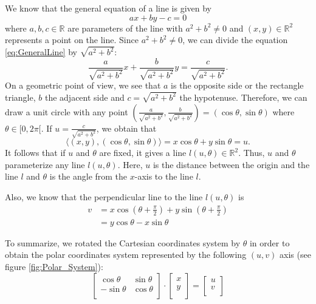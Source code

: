 \documentclass{article}
\begin{document}
We know that the general equation of a line is given by 
\begin{equation} \label{eq:GeneralLine}
	ax + by - c = 0
\end{equation}
where $a,b,c \in \mathbb{R}$ are parameters of the line with $a^2 +  b^2 \neq 0$ and $(x, y) \in \mathbb{R}^2$ represents a point on the line. Since $a^2 +  b^2 \neq 0$, we can divide the equation \eqref{eq:GeneralLine} by $\sqrt{a^2 + b^2}$:
\begin{equation}
	\frac{a}{\sqrt{a^2 + b^2}} x + \frac{b}{\sqrt{a^2 + b^2}} y = \frac{c}{\sqrt{a^2 + b^2}}.
\end{equation}
On a geometric point of view, we see that $a$ is the opposite side or the rectangle triangle, $b$ the adjacent side and $c = \sqrt{a^2 + b^2}$ the hypotenuse. Therefore, we can draw a unit circle with any point $\left(\frac{a}{\sqrt{a^2 + b^2}}, \frac{b}{\sqrt{a^2 + b^2}}\right) = (\cos \theta, \sin \theta)$ where $\theta \in [0, 2\pi[$. If $u = \frac{c}{\sqrt{a^2 + b^2}}$, we obtain that
\begin{equation} \label{eq:u_coordinates}
	\langle (x, y), (\cos \theta, \sin \theta) \rangle = x \cos \theta + y \sin \theta = u.
\end{equation}
It follows that if $u$ and $\theta$ are fixed, it gives a line $l(u, \theta) \in \mathbb{R}^2$. Thus, $u$ and $\theta$ parameterize any line $l(u, \theta)$. Here, $u$ is the distance between the origin and the line $l$ and $\theta$ is the angle from the $x$-axis to the line $l$.

Also, we know that the perpendicular line to the line $l(u, \theta)$ is
\begin{equation}
\begin{aligned}
v &= x \cos \left(\theta + \frac{\pi}{2}\right) + y \sin \left(\theta + \frac{\pi}{2}\right) \\
  &= y \cos \theta - x \sin \theta
\end{aligned}
\end{equation}

To summarize, we rotated the Cartesian coordinates system by $\theta$ in order to obtain the polar coordinates system represented by the following $(u, v)$ axis (see figure \ref{fig:Polar_System}): 
\begin{equation} \label{eq:RotationSystem}
	\begin{bmatrix}
	    \cos \theta & \sin \theta \\
	    -\sin \theta & \cos \theta \\
	\end{bmatrix}
\cdot
	\begin{bmatrix}
  		x \\
  		y \\
	\end{bmatrix}
=
	\begin{bmatrix}
	    u \\
	    v \\
	\end{bmatrix}
\end{equation}
\end{document}
